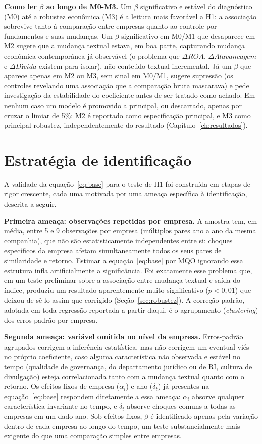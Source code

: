 \documentclass[a4paper,12pt]{report}
\begin{document}
\textbf{Como ler $\beta$ ao longo de M0-M3.} Um $\beta$ significativo e estável do diagnóstico (M0) até a robustez econômica (M3) é a leitura mais favorável a H1: a associação sobrevive tanto à comparação entre empresas quanto ao controle por fundamentos e suas mudanças. Um $\beta$ significativo em M0/M1 que desaparece em M2 sugere que a mudança textual estava, em boa parte, capturando mudança econômica contemporânea já observável (o problema que $\Delta\mathit{ROA}$, $\Delta\mathit{Alavancagem}$ e $\Delta\mathit{Dívida}$ existem para isolar), não conteúdo textual incremental. Já um $\beta$ que aparece apenas em M2 ou M3, sem sinal em M0/M1, sugere supressão (os controles revelando uma associação que a comparação bruta mascarava) e pede investigação da estabilidade do coeficiente antes de ser tratado como achado. Em nenhum caso um modelo é promovido a principal, ou descartado, apenas por cruzar o limiar de 5\%: M2 é reportado como especificação principal, e M3 como principal robustez, independentemente do resultado (Capítulo~\ref{ch:resultados}).

\section{Estratégia de identificação}
\label{sec:identificacao}

A validade da equação~\ref{eq:base} para o teste de H1 foi construída em etapas de rigor crescente, cada uma motivada por uma ameaça específica à identificação, descrita a seguir.

\textbf{Primeira ameaça: observações repetidas por empresa.} A amostra tem, em média, entre 5 e 9 observações por empresa (múltiplos pares ano a ano da mesma companhia), que não são estatisticamente independentes entre si: choques específicos da empresa afetam simultaneamente todos os seus pares de similaridade e retorno. Estimar a equação~\ref{eq:base} por MQO ignorando essa estrutura infla artificialmente a significância. Foi exatamente esse problema que, em um teste preliminar sobre a associação entre mudança textual e saída do índice, produziu um resultado aparentemente muito significativo ($p<0{,}01$) que deixou de sê-lo assim que corrigido (Seção~\ref{sec:robustez}). A correção padrão, adotada em toda regressão reportada a partir daqui, é o agrupamento (\textit{clustering}) dos erros-padrão por empresa.

\textbf{Segunda ameaça: variável omitida no nível da empresa.} Erros-padrão agrupados corrigem a inferência estatística, mas não corrigem um eventual viés no próprio coeficiente, caso alguma característica não observada e estável no tempo (qualidade de governança, do departamento jurídico ou de RI, cultura de divulgação) esteja correlacionada tanto com a mudança textual quanto com o retorno. Os efeitos fixos de empresa ($\alpha_i$) e ano ($\delta_t$) já presentes na equação~\ref{eq:base} respondem diretamente a essa ameaça: $\alpha_i$ absorve qualquer característica invariante no tempo, e $\delta_t$ absorve choques comuns a todas as empresas em um dado ano. Sob efeitos fixos, $\beta$ é identificado apenas pela variação dentro de cada empresa ao longo do tempo, um teste substancialmente mais exigente do que uma comparação simples entre empresas.
\end{document}
